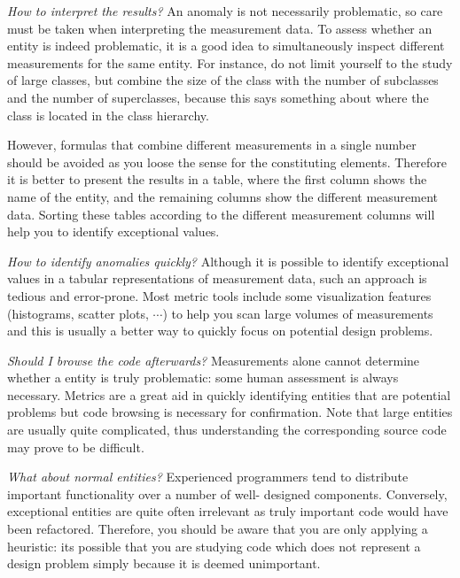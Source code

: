 \documentclass[a4paper,10pt,twoside]{book}
\begin{document}
\begin{bulletlist}

\item \emph{How to interpret the results?}
An anomaly is not necessarily problematic, so care must be taken when interpreting the 
measurement data. To assess whether an entity is indeed problematic, it is a good idea to 
simultaneously inspect different measurements for the same entity. For instance, do not 
limit yourself to the study of large classes, but combine the size of the class with the 
number of subclasses and the number of superclasses, because this says something about 
where the class is located in the class hierarchy.

However, formulas that combine different measurements in a single number should be avoided 
as you loose the sense for the constituting elements. Therefore it is better to present the 
results in a table, where the first column shows the name of the entity, and the remaining 
columns show the different measurement data. Sorting these tables according to the 
different measurement columns will help you to identify exceptional values.

\item \emph{How to identify anomalies quickly?}
Although it is possible to identify exceptional values in a tabular representations of 
measurement data, such an approach is tedious and error-prone. Most metric tools include 
some visualization features (histograms, scatter plots, $\cdots$) to help you scan large 
volumes of measurements and this is usually a better way to quickly focus on potential 
design problems.

\item \emph{Should I browse the code afterwards?}
Measurements alone cannot determine whether a entity is truly problematic: some human 
assessment is always necessary. Metrics are a great aid in quickly identifying entities 
that are potential problems but code browsing is necessary for confirmation. Note that 
large entities are usually quite complicated, thus understanding the corresponding source 
code may prove to be difficult.

\item \emph{What about normal entities?}
Experienced programmers tend to distribute important functionality over a number of well-
designed components. Conversely, exceptional entities are quite often irrelevant as truly 
important code would have been refactored. Therefore, you should be aware that you are only 
applying a heuristic: its possible that you are studying code which does not represent a 
design problem simply because it is deemed unimportant.
\end{bulletlist}
\end{document}

